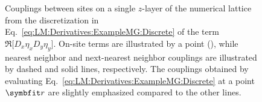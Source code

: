 \begin{figure}[h]
\caption{Couplings between sites on a single $z$-layer of the numerical lattice from the discretization in Eq.~\eqref{eq:LM:Derivatives:ExampleMG:Discrete}
of the term $\Re\big[D_x\eta_xD_y\eta_y\big]$. On-site terms are illustrated by a point (\textbullet), while nearest neighbor and next-nearest neighbor couplings are
illustrated by dashed and solid lines, respectively. The couplings obtained by evaluating Eq.~\eqref{eq:LM:Derivatives:ExampleMG:Discrete} at a point $\v{r}$ are
slightly emphasized compared to the other lines.}
  \label{fig:LM:Derivatives:nextNearestDiagonalCoupling}
\end{figure}

